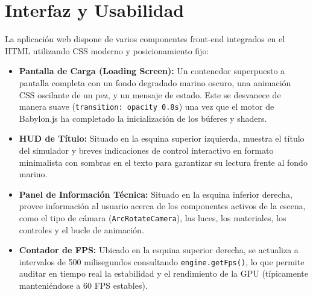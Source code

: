 \documentclass[12pt,a4paper]{article}
\begin{document}
\newpage
\section{Interfaz y Usabilidad}
La aplicación web dispone de varios componentes front-end integrados en el HTML utilizando CSS moderno y posicionamiento fijo:

\begin{itemize}
    \item \textbf{Pantalla de Carga (Loading Screen):} Un contenedor superpuesto a pantalla completa con un fondo degradado marino oscuro, una animación CSS oscilante de un pez, y un mensaje de estado. Este se desvanece de manera suave (\texttt{transition: opacity 0.8s}) una vez que el motor de Babylon.js ha completado la inicialización de los búferes y shaders.
    \item \textbf{HUD de Título:} Situado en la esquina superior izquierda, muestra el título del simulador y breves indicaciones de control interactivo en formato minimalista con sombras en el texto para garantizar su lectura frente al fondo marino.
    \item \textbf{Panel de Información Técnica:} Situado en la esquina inferior derecha, provee información al usuario acerca de los componentes activos de la escena, como el tipo de cámara (\texttt{ArcRotateCamera}), las luces, los materiales, los controles y el bucle de animación.
    \item \textbf{Contador de FPS:} Ubicado en la esquina superior derecha, se actualiza a intervalos de 500 milisegundos consultando \texttt{engine.getFps()}, lo que permite auditar en tiempo real la estabilidad y el rendimiento de la GPU (típicamente manteniéndose a 60 FPS estables).
\end{itemize}
\end{document}
